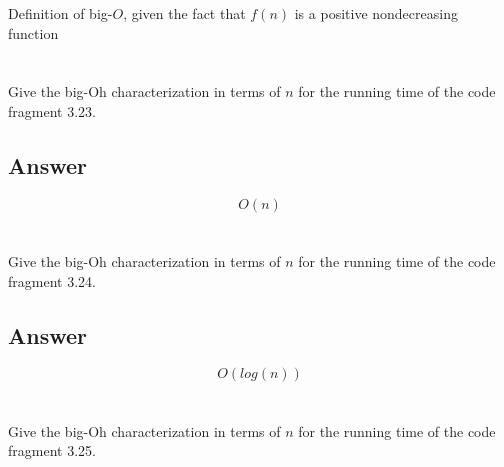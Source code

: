 \documentclass{article}
\begin{document}
\begin{mdframed}

  Definition of big-\(O\), given the fact that \(f(n)\) is a positive
  nondecreasing function

\end{mdframed}


\section{}

Give the big-Oh characterization in terms of \(n\) for the running time of the
code fragment 3.23.

\subsection{Answer}

\begin{mdframed}

  \begin{equation*}
    O(n)
  \end{equation*}

\end{mdframed}


\section{}

Give the big-Oh characterization in terms of \(n\) for the running time of the
code fragment 3.24.

\subsection{Answer}

\begin{mdframed}

  \begin{equation*}
    O(log(n))
  \end{equation*}

\end{mdframed}


\section{}

Give the big-Oh characterization in terms of \(n\) for the running time of the
code fragment 3.25.
\end{document}
